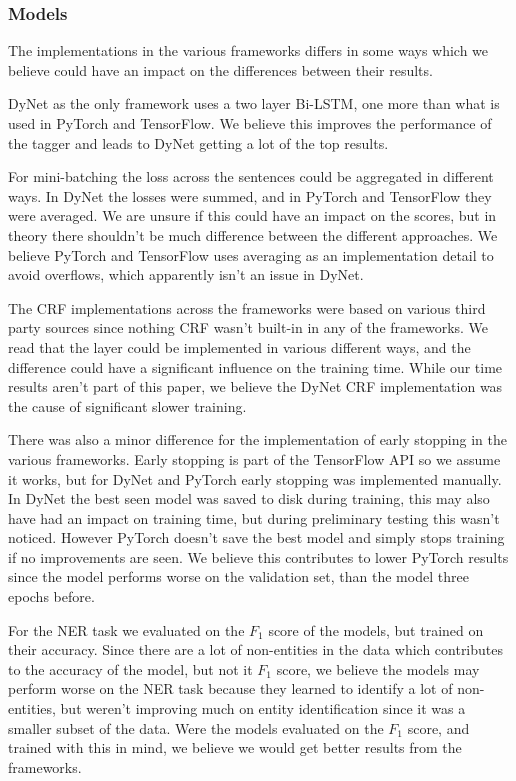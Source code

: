 \subsubsection{Models}

The implementations in the various frameworks differs in some ways which we
believe could have an impact on the differences between their results. 

DyNet as the only framework uses a two layer Bi-LSTM, one more than what is used
in PyTorch and TensorFlow. We believe this improves the performance of the
tagger and leads to DyNet getting a lot of the top results. 

For mini-batching the loss across the sentences could be aggregated in different
ways. In DyNet the losses were summed, and in PyTorch and TensorFlow they were
averaged. We are unsure if this could have an impact on the scores, but in
theory there shouldn't be much difference between the different approaches. We
believe PyTorch and TensorFlow uses averaging as an implementation detail to
avoid overflows, which apparently isn't an issue in DyNet.

The CRF implementations across the frameworks were based on various third party
sources since nothing CRF wasn't built-in in any of the frameworks. We read that
the layer could be implemented in various different ways, and the difference
could have a significant influence on the training time. While our time results
aren't part of this paper, we believe the DyNet CRF implementation was the cause
of significant slower training.

There was also a minor difference for the implementation of early stopping in
the various frameworks. Early stopping is part of the TensorFlow API so we
assume it works, but for DyNet and PyTorch early stopping was implemented
manually. In DyNet the best seen model was saved to disk during training, this
may also have had an impact on training time, but during preliminary testing
this wasn't noticed. However PyTorch doesn't save the best model and simply
stops training if no improvements are seen. We believe this contributes to lower
PyTorch results since the model performs worse on the validation set, than the
model three epochs before. 

For the NER task we evaluated on the $F_1$ score of the models, but trained on
their accuracy. Since there are a lot of non-entities in the data which
contributes to the accuracy of the model, but not it $F_1$ score, we believe the
models may perform worse on the NER task because they learned to identify a lot
of non-entities, but weren't improving much on entity identification since it
was a smaller subset of the data. Were the models evaluated on the $F_1$ score,
and trained with this in mind, we believe we would get better results from the
frameworks. 

